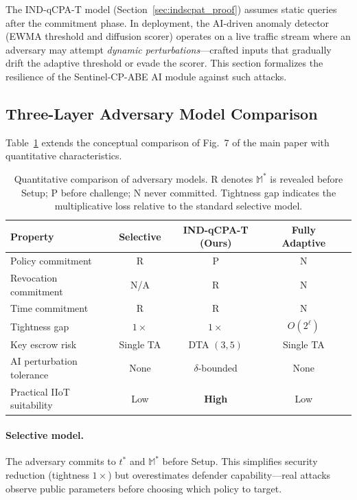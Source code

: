 \documentclass[lettersize,journal]{IEEEtran}
\begin{document}
The IND-qCPA-T model (Section~\ref{sec:indscpat_proof}) assumes static
queries after the commitment phase. In deployment, the AI-driven anomaly
detector (EWMA threshold and diffusion scorer) operates on a live traffic
stream where an adversary may attempt \emph{dynamic perturbations}---crafted
inputs that gradually drift the adaptive threshold or evade the scorer.
This section formalizes the resilience of the Sentinel-CP-ABE AI module
against such attacks.

\subsection{Three-Layer Adversary Model Comparison}
\label{subsec:adv_comparison}

Table~\ref{tab:adv_comparison} extends the conceptual comparison of
Fig.~7 of the main paper with quantitative characteristics.

\begin{table}[t]
\centering
\caption{Quantitative comparison of adversary models. R denotes $\mathbb{M}^*$
is revealed before Setup; P before challenge; N never committed.
Tightness gap indicates the multiplicative loss relative to the standard
selective model.}
\label{tab:adv_comparison}
\begin{tabular}{lcccc}
\toprule
Property & Selective & IND-qCPA-T (Ours) & Fully Adaptive \\
\midrule
Policy commitment & R & P & N \\
Revocation commitment & N/A & R & N \\
Time commitment & R & R & N \\
Tightness gap & $1\times$ & $1\times$ & $O(2^\ell)$ \\
Key escrow risk & Single TA & DTA $(3,5)$ & Single TA \\
AI perturbation tolerance & None & $\delta$-bounded & None \\
\midrule
Practical IIoT suitability & Low & \textbf{High} & Low \\
\midrule
\end{tabular}
\end{table}

\paragraph{Selective model.} The adversary commits to $t^*$ and $\mathbb{M}^*$
before Setup. This simplifies security reduction (tightness $1\times$) but
overestimates defender capability---real attacks observe public parameters
before choosing which policy to target.
\end{document}
